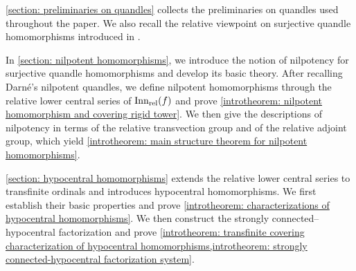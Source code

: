 



\begin{Out}
\cref{section: preliminaries on quandles} collects the preliminaries on quandles used throughout the paper. We also recall the relative viewpoint on surjective quandle homomorphisms introduced in \cite{preprint_yuki_tomoki_2026_relativization_of_symmetries_on_quandles}.
 
In \cref{section: nilpotent homomorphisms}, we introduce the notion of nilpotency for surjective quandle homomorphisms and develop its basic theory. After recalling Darn\'e's nilpotent quandles, we define nilpotent homomorphisms through the relative lower central series of $\operatorname{Inn_{rel}}(f)$ and prove \cref{introtheorem: nilpotent homomorphism and covering rigid tower}.
We then give the descriptions of nilpotency in terms of the relative transvection group and of the relative adjoint group, which yield \cref{introtheorem: main structure theorem for nilpotent homomorphisms}.
 
\cref{section: hypocentral homomorphisms} extends the relative lower central series to transfinite ordinals and introduces hypocentral homomorphisms. We first establish their basic properties and prove \cref{introtheorem: characterizations of hypocentral homomorphisms}. We then construct the strongly connected--hypocentral factorization and prove \cref{introtheorem: transfinite covering characterization of hypocentral homomorphisms,introtheorem: strongly connected-hypocentral factorization system}.
 

\end{Out}

